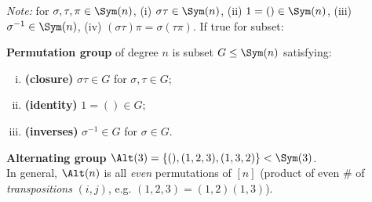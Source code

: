 \begin{slide}
    \textit{Note:} for $\sigma,\tau,\pi \in \Sym(n)$, (i) $\sigma\tau \in \Sym(n)$, (ii) $1 = () \in \Sym(n)$, (iii) $\sigma^{-1} \in \Sym(n)$, (iv) $(\sigma\tau)\pi = \sigma(\tau\pi)$. If true for subset:

    \begin{definition}
        \vspace{0pt}
        \textbf{Permutation group} of degree $n$ is subset $G \leq \Sym(n)$ satisfying:
        \begin{enumerate}[(i)]
            \item \textbf{(closure)} $\sigma\tau \in G$ for $\sigma,\tau \in G$; \pause
            \item \textbf{(identity)} $1 = () \in G$; \pause
            \item \textbf{(inverses)} $\sigma^{-1} \in G$ for $\sigma \in G$.
        \end{enumerate}
    \end{definition}

    \begin{example}
        \vspace{0pt}
        \textbf{Alternating group} $\Alt(3) = \{(),(1,2,3),(1,3,2)\} < \Sym(3)$. \\
        In general, $\Alt(n)$ is all \textit{even} permutations of $[n]$ (product of even \# of \textit{transpositions} $(i,j)$, e.g. $(1,2,3) = (1,2)(1,3)$).
    \end{example}
\end{slide}



